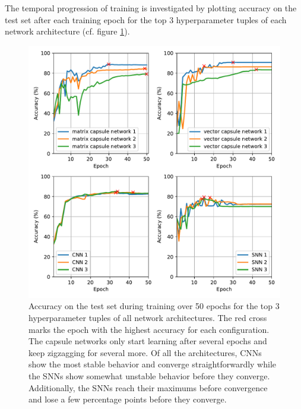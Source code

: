 The temporal progression of training is investigated by plotting accuracy on the test set after each training epoch for the top 3 hyperparameter tuples of each network architecture (cf. figure \ref{fig:learning-curves}).
\begin{figure}[H]
    \centering
\includegraphics[width=\textwidth]{figures/learning_curves.pdf}
\caption[Accuracy on the test set during training over 50 epochs for all network architectures]{Accuracy on the test set during training over 50 epochs for the top 3 hyperparameter tuples of all network architectures. The red cross marks the epoch with the highest accuracy for each configuration. The capsule networks only start learning after several epochs and keep zigzagging for several more. Of all the architectures, CNNs show the most stable behavior and converge straightforwardly while the SNNs show somewhat unstable behavior before they converge. Additionally, the SNNs reach their maximums before convergence and lose a few percentage points before they converge.}\label{fig:learning-curves}
\end{figure}\newpage\noindent

